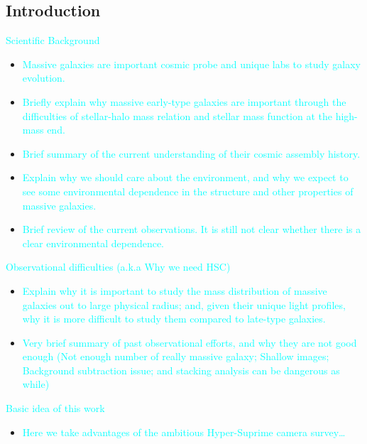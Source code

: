 \documentclass{emulateapj}
\newcommand{\plan}[1]{\textcolor{cyan}{#1}}
\begin{document}
\begin{CJK*}{UTF8}{gbsn}
\section{Introduction}
    \label{sec:intro}
    
    \plan{Scientific Background}
    \begin{itemize}
        \item \plan{Massive galaxies are important cosmic probe and unique labs to study 
            galaxy evolution.} 
        \item \plan{Briefly explain why massive early-type galaxies are important through 
            the difficulties of stellar-halo mass relation and stellar mass function at 
            the high-mass end.}
        \item \plan{Brief summary of the current understanding of their cosmic assembly 
            history.}
        \item \plan{Explain why we should care about the environment, and why we expect to 
            see some environmental dependence in the structure and other properties of
            massive galaxies.}
        \item \plan{Brief review of the current observations.  It is still not clear 
            whether there is a clear environmental dependence.}
    \end{itemize}

    \plan{Observational difficulties (a.k.a Why we need HSC)}
    \begin{itemize}
        \item \plan{Explain why it is important to study the mass distribution of 
            massive galaxies out to large physical radius; and, given their unique light 
            profiles, why it is more difficult to study them compared to late-type 
            galaxies.}
        \item \plan{Very brief summary of past observational efforts, and why they are not 
            good enough (Not enough number of really massive galaxy; Shallow images; 
            Background subtraction issue; and stacking analysis can be dangerous as while)}
    \end{itemize}
    
    \plan{Basic idea of this work}
    \begin{itemize}
        \item \plan{Here we take advantages of the ambitious Hyper-Suprime camera 
            survey\ldots}
    \end{itemize}
        

\end{CJK*}
\end{document}
